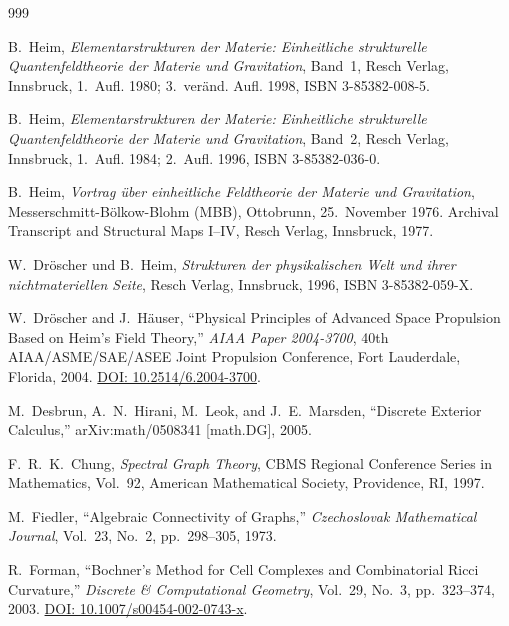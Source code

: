 \documentclass[
    12pt,
    a4paper,
    headings=normal,
    twoside=false,
    open=any,
    parskip=half
]{scrbook}
\begin{document}
\begin{thebibliography}{999}

B.~Heim, \textit{Elementarstrukturen der Materie: Einheitliche strukturelle Quantenfeldtheorie der Materie und Gravitation}, Band~1, Resch Verlag, Innsbruck, 1.~Aufl. 1980; 3.~ver\"{a}nd. Aufl. 1998, ISBN 3-85382-008-5.

B.~Heim, \textit{Elementarstrukturen der Materie: Einheitliche strukturelle Quantenfeldtheorie der Materie und Gravitation}, Band~2, Resch Verlag, Innsbruck, 1.~Aufl. 1984; 2.~Aufl. 1996, ISBN 3-85382-036-0.

B.~Heim, \textit{Vortrag \"{u}ber einheitliche Feldtheorie der Materie und Gravitation}, Messerschmitt-B\"{o}lkow-Blohm (MBB), Ottobrunn, 25.~November 1976. Archival Transcript and Structural Maps I--IV, Resch Verlag, Innsbruck, 1977.

W.~Dr\"{o}scher und B.~Heim, \textit{Strukturen der physikalischen Welt und ihrer nichtmateriellen Seite}, Resch Verlag, Innsbruck, 1996, ISBN 3-85382-059-X.

W.~Dr\"{o}scher and J.~H\"{a}user, ``Physical Principles of Advanced Space Propulsion Based on Heim's Field Theory,'' \textit{AIAA Paper 2004-3700}, 40th AIAA/ASME/SAE/ASEE Joint Propulsion Conference, Fort Lauderdale, Florida, 2004. \href{https://doi.org/10.2514/6.2004-3700}{DOI: 10.2514/6.2004-3700}.

M.~Desbrun, A.~N.~Hirani, M.~Leok, and J.~E.~Marsden, ``Discrete Exterior Calculus,'' arXiv:math/0508341 [math.DG], 2005.

F.~R.~K.~Chung, \textit{Spectral Graph Theory}, CBMS Regional Conference Series in Mathematics, Vol.~92, American Mathematical Society, Providence, RI, 1997.

M.~Fiedler, ``Algebraic Connectivity of Graphs,'' \textit{Czechoslovak Mathematical Journal}, Vol.~23, No.~2, pp.~298--305, 1973.

R.~Forman, ``Bochner's Method for Cell Complexes and Combinatorial Ricci Curvature,'' \textit{Discrete \& Computational Geometry}, Vol.~29, No.~3, pp.~323--374, 2003. \href{https://doi.org/10.1007/s00454-002-0743-x}{DOI: 10.1007/s00454-002-0743-x}.


\end{thebibliography}
\end{document}
